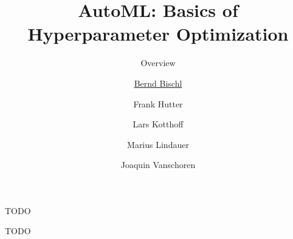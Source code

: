 




\title[AutoML: Overview]{AutoML: Basics of Hyperparameter Optimization} %
\subtitle{Overview} %
\author[Marius Lindauer]{\underline{Bernd Bischl} \and Frank Hutter \and Lars Kotthoff \newline \and Marius Lindauer \and Joaquin Vanschoren}
\institute{}
\date{}





	
	\maketitle
	

\begin{frame}[c]{TODO}

TODO

\end{frame}


